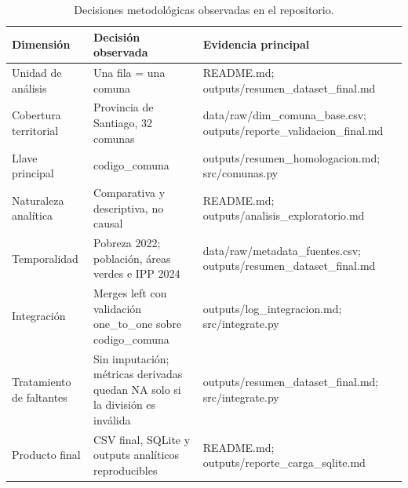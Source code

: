 \begin{table}[htbp]
\centering
\footnotesize
\caption{Decisiones metodológicas observadas en el repositorio.}
\begin{tabular}{|p{3.0cm}|p{5.6cm}|p{5.0cm}|}
\hline
Dimensión & Decisión observada & Evidencia principal \\
\hline
Unidad de análisis & Una fila = una comuna & README.md; outputs/resumen\_dataset\_final.md \\
Cobertura territorial & Provincia de Santiago, 32 comunas & data/raw/dim\_comuna\_base.csv; outputs/reporte\_validacion\_final.md \\
Llave principal & codigo\_comuna & outputs/resumen\_homologacion.md; src/comunas.py \\
Naturaleza analítica & Comparativa y descriptiva, no causal & README.md; outputs/analisis\_exploratorio.md \\
Temporalidad & Pobreza 2022; población, áreas verdes e IPP 2024 & data/raw/metadata\_fuentes.csv; outputs/resumen\_dataset\_final.md \\
Integración & Merges left con validación one\_to\_one sobre codigo\_comuna & outputs/log\_integracion.md; src/integrate.py \\
Tratamiento de faltantes & Sin imputación; métricas derivadas quedan NA solo si la división es inválida & outputs/resumen\_dataset\_final.md; src/integrate.py \\
Producto final & CSV final, SQLite y outputs analíticos reproducibles & README.md; outputs/reporte\_carga\_sqlite.md \\
\hline
\end{tabular}
\end{table}
